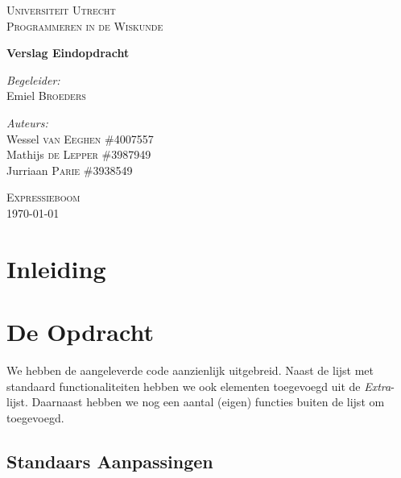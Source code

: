 \documentclass[12pt]{article}
\begin{document}
\begin{titlepage}
\begin{center}

\textsc{\LARGE Universiteit Utrecht}\\[1.6cm]

\textsc{\Large Programmeren in de Wiskunde}\vspace{2pc}

{\huge \bfseries Verslag Eindopdracht}
\vspace{3pc}

\begin{minipage}{0.7\textwidth}
\begin{flushleft} \large
\emph{Begeleider:} \\
Emiel \textsc{Broeders} 
\end{flushleft}
\begin{flushleft} \large
\emph{Auteurs:}\\
Wessel \textsc{van Eeghen} \tab\#4007557\\
Mathijs \textsc{de Lepper}  \tab\#3987949\\
Jurriaan \textsc{Parie}  \tab\tab\#3938549
\end{flushleft}
\end{minipage}
\begin{minipage}{0.4\textwidth}
\end{minipage}
\vspace{10pc} 

\textsc{\Large Expressieboom}\\[4.0cm]
{\large \today}
\end{center}
\end{titlepage}

\newpage

\section{Inleiding}


\section{De Opdracht}
We hebben de aangeleverde code aanzienlijk uitgebreid. Naast de lijst met standaard functionaliteiten hebben we ook elementen toegevoegd uit de \textit{Extra}-lijst. Daarnaast hebben we nog een aantal (eigen) functies buiten de lijst om toegevoegd. 

\subsection*{Standaars Aanpassingen}
\end{document}
